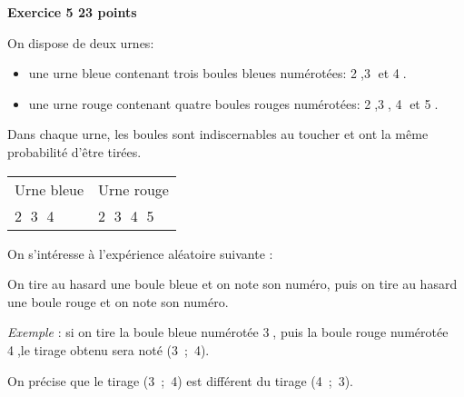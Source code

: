 \documentclass[10pt]{article}
\begin{document}
\bigskip

\textbf{Exercice 5 \hfill 23 points}

\medskip

On dispose de deux urnes:

\begin{itemize}
\item une urne bleue contenant trois boules bleues numérotées: \textcircled{2},\textcircled{3} et \textcircled{4}.
\item une urne rouge contenant quatre boules rouges numérotées: \textcircled{2},\textcircled{3}, \textcircled{4} et \textcircled{5}.
\end{itemize}

Dans chaque urne, les boules sont indiscernables au toucher et ont la même probabilité d'être tirées.

\begin{center}
\begin{tabularx}{\linewidth}{|*{2}{>{\centering \arraybackslash}X|}}\hline
Urne bleue &Urne rouge\\
\textcircled{2} \textcircled{3}  \textcircled{4}& \textcircled{2} \textcircled{3} \textcircled{4}  \textcircled{5}\\ \hline
\end{tabularx}
\end{center}
\medskip

On s'intéresse à l'expérience aléatoire suivante :

\og On tire au hasard une boule bleue et on note son numéro, puis on tire au hasard une boule rouge et on note son numéro. \fg

\emph{Exemple} : si on tire la boule bleue numérotée \textcircled{3}, puis la boule rouge numérotée \textcircled{4},le tirage obtenu sera noté (3~;~4).

On précise que le tirage (3~;~4) est différent du tirage (4~;~3).

\medskip
\end{document}
